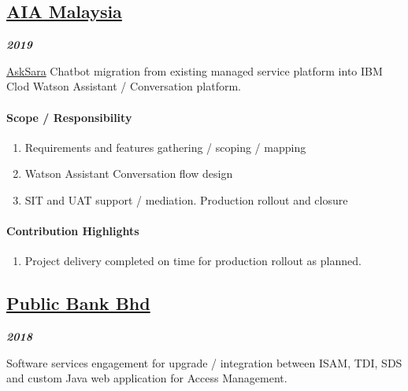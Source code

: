 \documentclass[
]{article}
\providecommand{\tightlist}{%
  \setlength{\itemsep}{0pt}\setlength{\parskip}{0pt}}
\begin{document}
\hypertarget{aia-malaysia}{%
\subsection{\texorpdfstring{\href{https://www.aia.com.my/en/index.html}{AIA
Malaysia}}{AIA Malaysia}}\label{aia-malaysia}}

\textbf{\emph{2019}}

\href{https://www.aia.com.my/en/about-aia/media-centre/press-releases/2017/aia-launches-first-insurance-chatbot-in-malaysia.html}{AskSara}
Chatbot migration from existing managed service platform into IBM Clod
Watson Assistant / Conversation platform.

\hypertarget{scope-responsibility-4}{%
\paragraph{Scope / Responsibility}\label{scope-responsibility-4}}

\begin{enumerate}
\def\labelenumi{\arabic{enumi}.}
\tightlist
\item
  Requirements and features gathering / scoping / mapping
\item
  Watson Assistant Conversation flow design
\item
  SIT and UAT support / mediation. Production rollout and closure
\end{enumerate}

\hypertarget{contribution-highlights-3}{%
\paragraph{Contribution Highlights}\label{contribution-highlights-3}}

\begin{enumerate}
\def\labelenumi{\arabic{enumi}.}
\tightlist
\item
  Project delivery completed on time for production rollout as planned.
\end{enumerate}

\hypertarget{public-bank-bhd}{%
\subsection{\texorpdfstring{\href{https://www.pbebank.com/}{Public Bank
Bhd}}{Public Bank Bhd}}\label{public-bank-bhd}}

\textbf{\emph{2018}}

Software services engagement for upgrade / integration between ISAM,
TDI, SDS and custom Java web application for Access Management.
\end{document}
